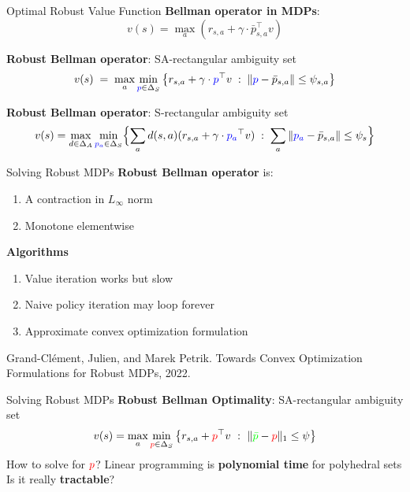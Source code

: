 \documentclass{beamer}
\newcommand{\tc}[2]{\textcolor{#1}{#2}}
\newcommand{\tcb}[1]{\tc{blue}{#1}}
\newcommand{\tcr}[1]{\tc{red}{#1}}
\newcommand{\tcg}[1]{\tc{green}{#1}}
\newcommand{\tr}{^{\top}}
\begin{document}
\begin{frame}{Optimal Robust Value Function}
    \textbf{Bellman operator in MDPs}:
    {\small
        \[
        v(s) = \max_{a} \left( r_{s,a} + \gamma \cdot \bar{p}_{s,a}\tr v \right)
        \]
    }

    \textbf{Robust Bellman operator}: \alert{SA-rectangular} ambiguity set
    {\small
        \[
        v(s) \; =\;  \max_{a} \min_{\tcb{p}\in\Delta_S}  \left\{ r_{s,a} + \gamma \cdot \tcb{p}\tr v  \;:\;  \|  \tcb{p} - \bar{p}_{s,a} \| \le \psi_{s,a} \right\}
        \]	
    }

    \textbf{Robust Bellman operator}: \alert{S-rectangular} ambiguity set
    {\small
        \[
        v(s) =
        \max_{d \in \Delta_A} \min_{\tcb{p_a}\in\Delta_S}
        \Bigl\{ \sum_{a} d(s,a) (r_{s,a} + \gamma \cdot \tcb{p_a} \tr v)
        \;:\;  \sum_a \| \tcb{p_{a}} - \bar{p}_{s,a} \| \le \psi_s \Bigr\}
        \]	
    }
\end{frame}

\begin{frame}{Solving Robust MDPs}
    \textbf{Robust Bellman operator} is:
    \begin{enumerate}
        \item A contraction in $L_\infty$ norm
        \item Monotone elementwise
    \end{enumerate}
    \vfill
    \textbf{Algorithms}
    \begin{enumerate}
        \item Value iteration works but slow
        \item Naive policy iteration may loop forever
        \item Approximate convex optimization formulation
    \end{enumerate}
    \vfill 
    {\tiny
      Grand-Clément, Julien, and Marek Petrik. Towards Convex Optimization Formulations for Robust MDPs, 2022.
}
\end{frame}


\begin{frame}{Solving Robust MDPs}
 \textbf{Robust Bellman Optimality}: SA-rectangular ambiguity set
    \[
    v(s) = \max_{a} \min_{\tcr{p}\in\Delta_S}
    \left\{ r_{s,a} + \tcr{p}\tr v   ~:~ \| \tcg{\bar{p}} - \tcr{p} \|_1 \le \psi \right\}
    \]	
 How to solve for $\tcr{p}$?
\vfill
 Linear programming is \textbf{polynomial time} for polyhedral sets
\vfill
 Is it really \textbf{tractable}?
\end{frame}
\end{document}
